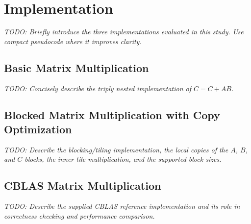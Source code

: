\section{Implementation}
\label{sec:implementation}

\textit{TODO: Briefly introduce the three implementations evaluated in this
study. Use compact pseudocode where it improves clarity.}

\subsection{Basic Matrix Multiplication}

\textit{TODO: Concisely describe the triply nested implementation of
$C = C + AB$.}

\subsection{Blocked Matrix Multiplication with Copy Optimization}

\textit{TODO: Describe the blocking/tiling implementation, the local copies of
the $A$, $B$, and $C$ blocks, the inner tile multiplication, and the supported
block sizes.}

\subsection{CBLAS Matrix Multiplication}

\textit{TODO: Describe the supplied CBLAS reference implementation and its role
in correctness checking and performance comparison.}

